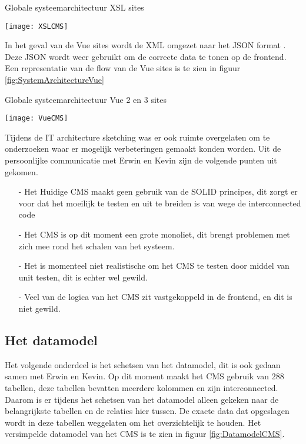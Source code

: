 \whitespace
\begin{graphic}
	\captionsetup{type=figure}
    \caption{Globale systeemarchitectuur \gls{XSL} sites}
	\texttt{[image: XSLCMS]}
	\label{fig:SystemArchitectureXSL}
\end{graphic}

\newpage

\whitespace
In het geval van de Vue sites wordt de XML omgezet naar het JSON format \parencite{JSON}.
Deze JSON wordt weer gebruikt om de correcte data te tonen op de frontend.
Een representatie van de flow van de Vue sites is te zien in figuur \ref{fig:SystemArchitectureVue}

\begin{graphic}
	\captionsetup{type=figure}
	\caption{Globale systeemarchitectuur Vue 2 en 3 sites}
    \texttt{[image: VueCMS]}
	\label{fig:SystemArchitectureVue}
\end{graphic}


\whitespace
Tijdens de IT architecture sketching was er ook ruimte overgelaten om te onderzoeken waar er mogelijk verbeteringen gemaakt konden worden.
Uit de persoonlijke communicatie met Erwin en Kevin zijn de volgende punten uit gekomen.

\begin{itemize}
	\item[-]{Het Huidige \gls{CMS} maakt geen gebruik van de SOLID principes, dit zorgt er voor dat het moeilijk te testen en uit te breiden is van wege de interconnected code}
	\item[-]{Het \gls{CMS} is op dit moment een grote monoliet, dit brengt problemen met zich mee rond het schalen van het systeem.}
	\item[-]{Het is momenteel niet realistische om het \gls{CMS} te testen door middel van unit testen, dit is echter wel gewild.}
    \item[-]{Veel van de logica van het CMS zit vastgekoppeld in de frontend, en dit is niet gewild.}
\end{itemize}

\newpage
\subsection{Het datamodel}
\label{subsection:Datamodel}
Het volgende onderdeel is het schetsen van het datamodel, dit is ook gedaan samen met Erwin en Kevin.
Op dit moment maakt het \gls{CMS} gebruik van 288 tabellen, deze tabellen bevatten meerdere kolommen en zijn interconnected.
Daarom is er tijdens het schetsen van het datamodel alleen gekeken naar de belangrijkste tabellen en de relaties hier tussen.
De exacte data dat opgeslagen wordt in deze tabellen weggelaten om het overzichtelijk te houden.
Het versimpelde datamodel van het CMS is te zien in figuur \ref{fig:DatamodelCMS}.

